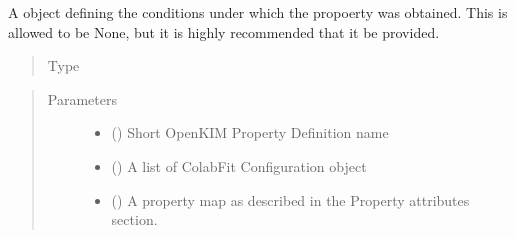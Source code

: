 \documentclass[letterpaper,10pt,english]{sphinxmanual}
\begin{document}
\begin{fulllineitems}
\begin{fulllineitems}
\begin{quote}
\begin{description}
\end{description}\end{quote}

\end{fulllineitems}


\begin{fulllineitems}
\label{\detokenize{property:colabfit.tools.property.Property.settings}}
\sphinxAtStartPar
A {\hyperref[\detokenize{property_settings:colabfit.tools.property_settings.PropertySettings}]{}} object
defining the conditions under which the propoerty was obtained. This
is allowed to be None, but it is highly recommended that it be
provided.
\begin{quote}\begin{description}
\item[{Type}] \leavevmode
\sphinxAtStartPar
{\hyperref[\detokenize{property_settings:colabfit.tools.property_settings.PropertySettings}]{}}

\end{description}\end{quote}

\end{fulllineitems}

\begin{quote}\begin{description}
\item[{Parameters}] \leavevmode\begin{itemize}
\item {} 
\sphinxAtStartPar
{} () \textendash{} Short OpenKIM Property Definition name

\item {} 
\sphinxAtStartPar
{} () \textendash{} A list of ColabFit Configuration object

\item {} 
\sphinxAtStartPar
{} () \textendash{} A property map as described in the Property attributes section.


\end{itemize}
\end{description}
\end{quote}
\end{fulllineitems}
\end{document}
